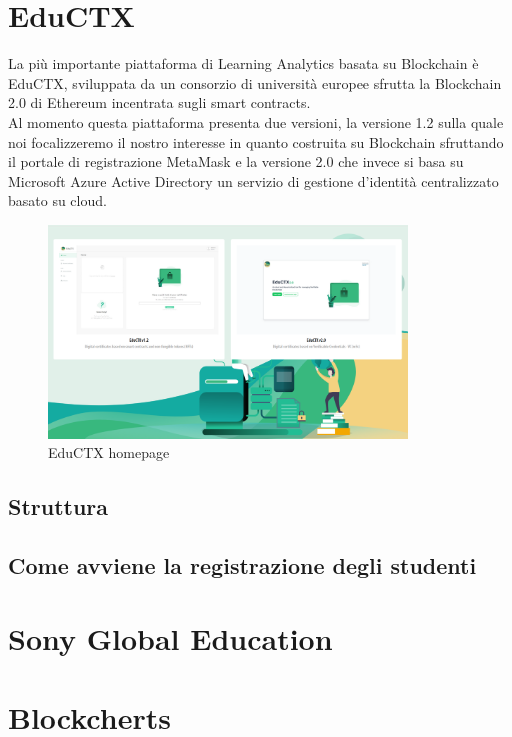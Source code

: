 \section{EduCTX}
La più importante piattaforma di Learning Analytics basata su Blockchain è EduCTX, sviluppata da un consorzio di università europee sfrutta la Blockchain 2.0 di Ethereum incentrata sugli smart contracts.
\\Al momento questa piattaforma presenta due versioni, la versione 1.2 sulla quale noi focalizzeremo il nostro interesse in quanto costruita su Blockchain
sfruttando il portale di registrazione MetaMask e la versione 2.0 che invece si basa su Microsoft Azure Active Directory un servizio di gestione d'identità centralizzato basato su cloud.
\begin{figure}[h]
    \centering
    \includegraphics[width=0.85\textwidth]{Immagini/EduCTX.PNG}
    \caption{EduCTX homepage}
\end{figure}

\subsection{Struttura}

\subsection{Come avviene la registrazione degli studenti}
\section{Sony Global Education}
\section{Blockcherts}